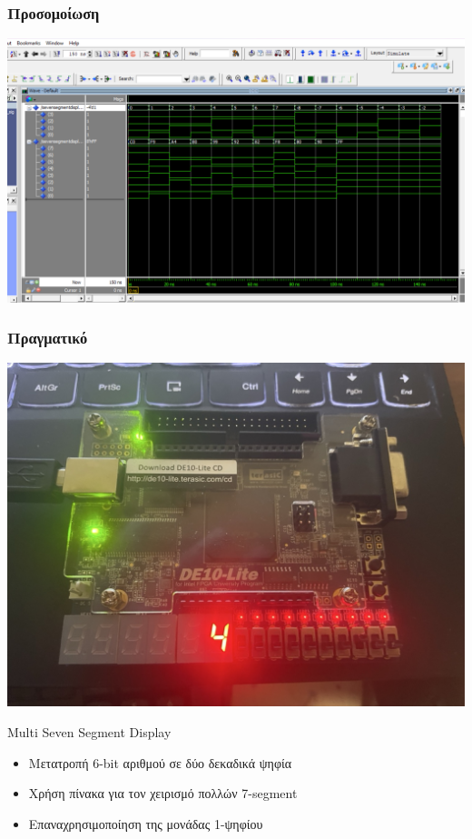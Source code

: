 \documentclass{beamer}
\begin{document}
\begin{frame}
\frametitle{Προσομοίωση}
	\centerline{\includegraphics[width=1\textwidth]{assets/ssd-tb.png}}
\end{frame}

\begin{frame}
\frametitle{Πραγματικό}
	\centerline{\includegraphics[angle=90, width=1\textwidth]{assets/ssd-real.jpeg}}
\end{frame}

\begin{frame}{Multi Seven Segment Display}
\begin{itemize}
  \item Μετατροπή 6-bit αριθμού σε δύο δεκαδικά ψηφία
  \item Χρήση πίνακα για τον χειρισμό πολλών 7-segment
  \item Επαναχρησιμοποίηση της μονάδας 1-ψηφίου
\end{itemize}
\end{frame}
\end{document}
